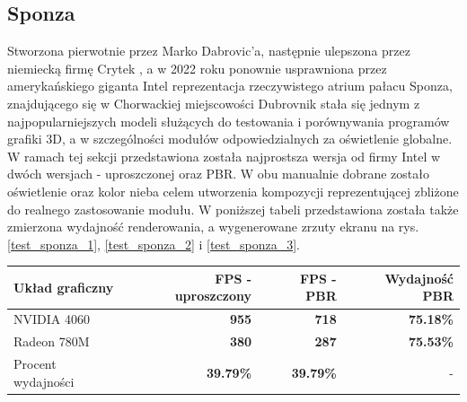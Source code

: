 \subsection{Sponza}
Stworzona pierwotnie przez Marko Dabrovic'a, następnie ulepszona przez niemiecką firmę Crytek \cite{github:Khronos:Sponza}, a w 2022 roku ponownie usprawniona przez amerykańskiego giganta Intel \cite{Intel:GPUResearch:Sponza} reprezentacja rzeczywistego atrium pałacu Sponza, znajdującego się w Chorwackiej miejscowości Dubrovnik stała się jednym z najpopularniejszych modeli służących do testowania i porównywania programów grafiki 3D, a w szczególności modułów odpowiedzialnych za oświetlenie globalne. W ramach tej sekcji przedstawiona została najprostsza wersja od firmy Intel w dwóch wersjach - uproszczonej oraz PBR. W obu manualnie dobrane zostało oświetlenie oraz kolor nieba celem utworzenia kompozycji reprezentującej zbliżone do realnego zastosowanie modułu. W poniższej tabeli przedstawiona została także zmierzona wydajność renderowania, a wygenerowane zrzuty ekranu na rys. \ref{test_sponza_1}, \ref{test_sponza_2} i \ref{test_sponza_3}.

\begin{center}
	\begin{tabular}{ |l r r r|}
		\hline
		\textbf{Układ graficzny} & \textbf{FPS - uproszczony} & \textbf{FPS - PBR} & \textbf{Wydajność PBR} \\
		\hline
		NVIDIA 4060 & \textbf{955} & \textbf{718} & \textbf{75.18\%} \\
		Radeon 780M & \textbf{380} & \textbf{287} & \textbf{75.53\%} \\
		Procent wydajności & \textbf{39.79\%} & \textbf{39.79\%} & - \\
		\hline
	\end{tabular}
\end{center}

